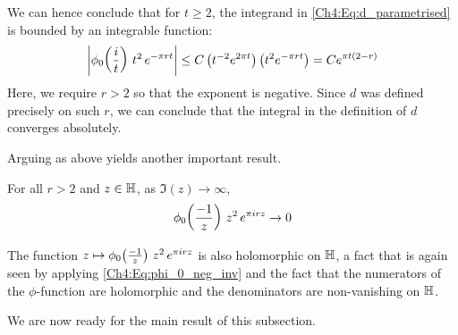 We can hence conclude that for $t \geq 2$, the integrand in \eqref{Ch4:Eq:d_parametrised} is bounded by an integrable function:
\begin{align*}
    \left\lvert \phi_0\!\left( \frac{i}{t} \right) \, t^2 \, e^{-\pi r t} \right\rvert 
    \leq C \left( t^{-2} e^{2\pi t} \right) \left( t^2 e^{-\pi r t} \right)
    = C e^{\pi t \left( 2 - r \right)}
\end{align*}
Here, we require $r > 2$ so that the exponent is negative. Since $d$ was defined precisely on such $r$, we can conclude that the integral in the definition of $d$ converges absolutely.

Arguing as above yields another important result.
\begin{boxlemma}\label{Ch4:Lemma:d_integrand_vanish_tendsto_ImInfty}
    For all $r > 2$ and $z \in \mathbb{H}$, as $\Im(z) \to \infty$,
    \begin{align*}
        \phi_{0}\!\left( \frac{-1}{z} \right) \, z^2 \, e^{\pi i r z} \to 0
    \end{align*}
\end{boxlemma}

The function $z \mapsto \phi_{0}\!\left( \frac{-1}{z} \right) \, z^2 \, e^{\pi i r z}$ is also holomorphic on $\mathbb{H}$, a fact that is again seen by applying \eqref{Ch4:Eq:phi_0_neg_inv} and the fact that the numerators of the $\phi$-function are holomorphic and the denominators are non-vanishing on $\mathbb{H}$.

We are now ready for the main result of this subsection.


